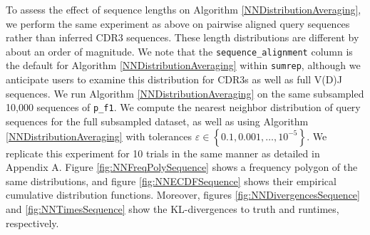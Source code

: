 \documentclass{article}
\begin{document}
To assess the effect of sequence lengths on Algorithm \ref{NNDistributionAveraging}, we perform the same experiment as above on pairwise aligned query sequences rather than inferred CDR3 sequences.
These length distributions are different by about an order of magnitude.
We note that the \texttt{sequence\_alignment} column is the default for Algorithm \ref{NNDistributionAveraging} within \texttt{sumrep}, although we anticipate users to examine this distribution for CDR3s as well as full V(D)J sequences.
We run Algorithm \ref{NNDistributionAveraging} on the same subsampled 10,000 sequences of \texttt{p\_f1}.
We compute the nearest neighbor distribution of query sequences for the full subsampled dataset, as well as using Algorithm \ref{NNDistributionAveraging} with tolerances $\varepsilon \in \left\{0.1, 0.001, \dotsc, 10^{-5} \right\}$.
We replicate this experiment for 10 trials in the same manner as detailed in Appendix A.
Figure \ref{fig:NNFreqPolySequence} shows a frequency polygon of the same distributions, and figure \ref{fig:NNECDFSequence} shows their empirical cumulative distribution functions.
Moreover, figures \ref{fig:NNDivergencesSequence}
 and \ref{fig:NNTimesSequence} show the KL-divergences to truth and runtimes, respectively.
\end{document}
